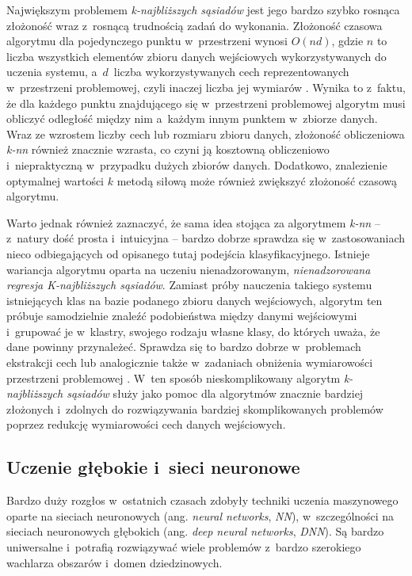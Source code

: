 {\begin{itemize}
        Największym problemem \emph{k-najbliższych sąsiadów} jest jego bardzo szybko rosnąca złożoność wraz z~rosnącą trudnością zadań do wykonania.
        Złożoność czasowa algorytmu dla pojedynczego punktu w~przestrzeni wynosi $O(nd)$, gdzie $n$ to liczba wszystkich elementów zbioru danych wejściowych wykorzystywanych do uczenia systemu, a~$d$~liczba wykorzystywanych cech reprezentowanych w~przestrzeni problemowej, czyli inaczej liczba jej wymiarów \cite{laviale2023deep}.
        Wynika to z~faktu, że dla każdego punktu znajdującego się w~przestrzeni problemowej algorytm musi obliczyć odległość między nim a~każdym innym punktem w~zbiorze danych.
        Wraz ze wzrostem liczby cech lub rozmiaru zbioru danych, złożoność obliczeniowa \emph{k-nn} również znacznie wzrasta, co czyni ją kosztowną obliczeniowo i~niepraktyczną w~przypadku dużych zbiorów danych.
        Dodatkowo, znalezienie optymalnej wartości $k$ metodą siłową może również zwiększyć złożoność czasową algorytmu.

        Warto jednak również zaznaczyć, że sama idea stojąca za algorytmem \emph{k-nn} -- z~natury dość prosta i~intuicyjna -- bardzo dobrze sprawdza się w~zastosowaniach nieco odbiegających od opisanego tutaj podejścia klasyfikacyjnego.
        Istnieje wariancja algorytmu oparta na uczeniu nienadzorowanym, \emph{nienadzorowana regresja K-najbliższych sąsiadów}.
        Zamiast próby nauczenia takiego systemu istniejących klas na bazie podanego zbioru danych wejściowych, algorytm ten próbuje samodzielnie znaleźć podobieństwa między danymi wejściowymi i~grupować je w~klastry, swojego rodzaju własne klasy, do których uważa, że dane powinny przynależeć.
        Sprawdza się to bardzo dobrze w~problemach ekstrakcji cech lub analogicznie także w~zadaniach obniżenia wymiarowości przestrzeni problemowej \cite{wang2015accelerating}.
        W~ten sposób nieskomplikowany algorytm \emph{k-najbliższych sąsiadów} służy jako pomoc dla algorytmów znacznie bardziej złożonych i~zdolnych do rozwiązywania bardziej skomplikowanych problemów poprzez redukcję wymiarowości cech danych wejściowych.

\end{itemize}

\subsection{Uczenie głębokie i~sieci neuronowe}
\label{sec:deep-learning}

Bardzo duży rozgłos w~ostatnich czasach zdobyły techniki uczenia maszynowego oparte na sieciach neuronowych (ang. \emph{neural networks}, \emph{NN}), w~szczególności na sieciach neuronowych głębokich (ang. \emph{deep neural networks}, \emph{DNN}).
Są bardzo uniwersalne i~potrafią rozwiązywać wiele problemów z~bardzo szerokiego wachlarza obszarów i~domen dziedzinowych.

}
